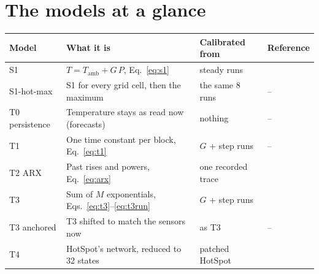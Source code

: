 \documentclass[11pt,a4paper]{article}
\begin{document}
\section{The models at a glance}
\begin{center}
\small
\begin{tabular}{@{}>{\raggedright\arraybackslash}p{2.4cm} >{\raggedright\arraybackslash}p{7.2cm} >{\raggedright\arraybackslash}p{3.6cm} >{\raggedright\arraybackslash}p{1.6cm}@{}}
\toprule
Model & What it is & Calibrated from & Reference \\
\midrule
S1 & $T = T_\text{amb} + G\,P$, Eq.~\eqref{eq:s1} & 8 steady runs & \cite{hotspot} \\
S1-hot-max & S1 for every grid cell, then the maximum & the same 8 runs & -- \\
T0 persistence & Temperature stays as read now (forecasts) & nothing & -- \\
T1 & One time constant per block, Eq.~\eqref{eq:t1} & $G$ + step runs & -- \\
T2 ARX & Past rises and powers, Eq.~\eqref{eq:arx} & one recorded trace & \cite{coskun09,singla15} \\
T3 & Sum of $M$ exponentials, Eqs.~\eqref{eq:t3}--\eqref{eq:t3run} & $G$ + step runs & \cite{pagani15,golub73} \\
T3 anchored & T3 shifted to match the sensors now & as T3 & -- \\
T4 & HotSpot's network, reduced to 32 states & patched HotSpot & \cite{sharifi08} \\
\bottomrule
\end{tabular}
\end{center}
\end{document}
